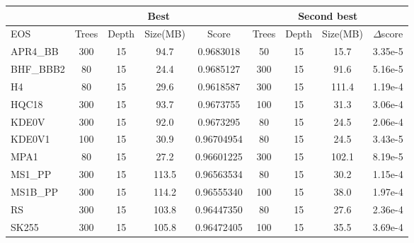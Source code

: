 \begin{table*}[h]
\centering
\begin{tabular}{@{}lcccccccc@{}}
\toprule
                                & \multicolumn{4}{c}{Best}                                & \multicolumn{4}{c}{Second best}                            \\ \midrule
\multicolumn{1}{|l|}{EOS}       & Trees & Depth & Size(MB)    & \multicolumn{1}{c|}{Score}      & Trees & Depth & Size(MB)    & \multicolumn{1}{c|}{$\Delta$score} \\ \midrule
\multicolumn{1}{|l|}{APR4\_BB}  & 300   & 15    & 94.7  & \multicolumn{1}{c|}{0.9683018}  & 50    & 15    & 15.7  & \multicolumn{1}{c|}{3.35e-5}       \\ \midrule
\multicolumn{1}{|l|}{BHF\_BBB2} & 80    & 15    & 24.4  & \multicolumn{1}{c|}{0.9685127}  & 300   & 15    & 91.6  & \multicolumn{1}{c|}{5.16e-5}       \\ \midrule
\multicolumn{1}{|l|}{H4}        & 80    & 15    & 29.6  & \multicolumn{1}{c|}{0.9618587}  & 300   & 15    & 111.4 & \multicolumn{1}{c|}{1.19e-4}       \\ \midrule
\multicolumn{1}{|l|}{HQC18}     & 300   & 15    & 93.7  & \multicolumn{1}{c|}{0.9673755}  & 100   & 15    & 31.3  & \multicolumn{1}{c|}{3.06e-4}       \\ \midrule
\multicolumn{1}{|l|}{KDE0V}     & 300   & 15    & 92.0  & \multicolumn{1}{c|}{0.9673295}  & 80    & 15    & 24.5  & \multicolumn{1}{c|}{2.06e-4}       \\ \midrule
\multicolumn{1}{|l|}{KDE0V1}    & 100   & 15    & 30.9  & \multicolumn{1}{c|}{0.96704954} & 80    & 15    & 24.5  & \multicolumn{1}{c|}{3.43e-5}       \\ \midrule
\multicolumn{1}{|l|}{MPA1}      & 80    & 15    & 27.2  & \multicolumn{1}{c|}{0.96601225} & 300   & 15    & 102.1 & \multicolumn{1}{c|}{8.19e-5}       \\ \midrule
\multicolumn{1}{|l|}{MS1\_PP}   & 300   & 15    & 113.5 & \multicolumn{1}{c|}{0.96563534} & 80    & 15    & 30.2  & \multicolumn{1}{c|}{1.15e-4}       \\ \midrule
\multicolumn{1}{|l|}{MS1B\_PP}  & 300   & 15    & 114.2 & \multicolumn{1}{c|}{0.96555340} & 100   & 15    & 38.0  & \multicolumn{1}{c|}{1.97e-4}       \\ \midrule
\multicolumn{1}{|l|}{RS}        & 300   & 15    & 103.8 & \multicolumn{1}{c|}{0.96447350} & 80    & 15    & 27.6  & \multicolumn{1}{c|}{2.36e-4}       \\ \midrule
\multicolumn{1}{|l|}{SK255}     & 300   & 15    & 105.8 & \multicolumn{1}{c|}{0.96472405} & 100   & 15    & 35.5  & \multicolumn{1}{c|}{3.69e-4}       \\ \midrule

\end{tabular}
\end{table*}
